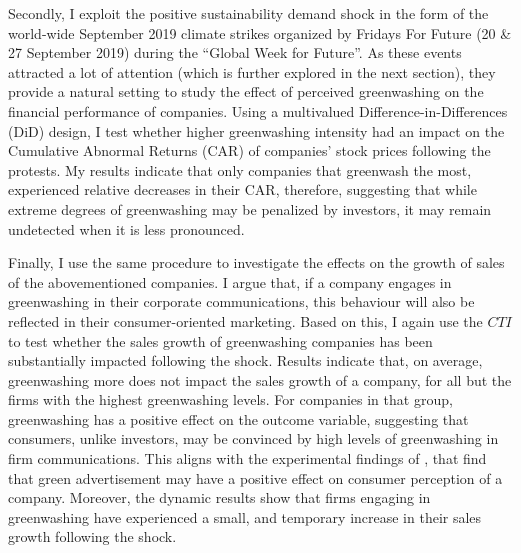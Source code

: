 \documentclass[12pt]{article}
\begin{document}
Secondly, I exploit the positive sustainability demand shock in the form of the world-wide September 2019 climate strikes organized by Fridays For Future (20 \& 27 September 2019) during the ``Global Week for Future''. As these events attracted a lot of attention (which is further explored in the next section), they provide a natural setting to study the effect of perceived greenwashing on the financial performance of companies. Using a multivalued Difference-in-Differences (DiD) design, I test whether higher greenwashing intensity had an impact on the Cumulative Abnormal Returns (CAR) of companies' stock prices following the protests. My results indicate that only companies that greenwash the most, experienced relative decreases in their CAR, therefore, suggesting that while extreme degrees of greenwashing may be penalized by investors, it may remain undetected when it is less pronounced.

Finally, I use the same procedure to investigate the effects on the growth of sales of the abovementioned companies. I argue that, if a company engages in greenwashing in their corporate communications, this behaviour will also be reflected in their consumer-oriented marketing. Based on this, I again use the $CTI$ to test whether the sales growth of greenwashing companies has been substantially impacted following the shock. Results indicate that, on average, greenwashing more does not impact the sales growth of a company, for all but the firms with the highest greenwashing levels. For companies in that group, greenwashing has a positive effect on the outcome variable, suggesting that consumers, unlike investors, may be convinced by high levels of greenwashing in firm communications. This aligns with the experimental findings of \textcite{schmuckMisleadingConsumersGreen2018,parguelCanEvokingNature2015}, that find that green advertisement may have a positive effect on consumer perception of a company. Moreover, the dynamic results show that firms engaging in greenwashing have experienced a small, and temporary increase in their sales growth following the shock. 
\end{document}
